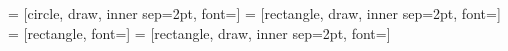  = [circle, draw, inner sep=2pt, font=\small]
 = [rectangle, draw, inner sep=2pt, font=\small]
 = [rectangle, font=\small]
 = [rectangle, draw, inner sep=2pt, font=\small]
